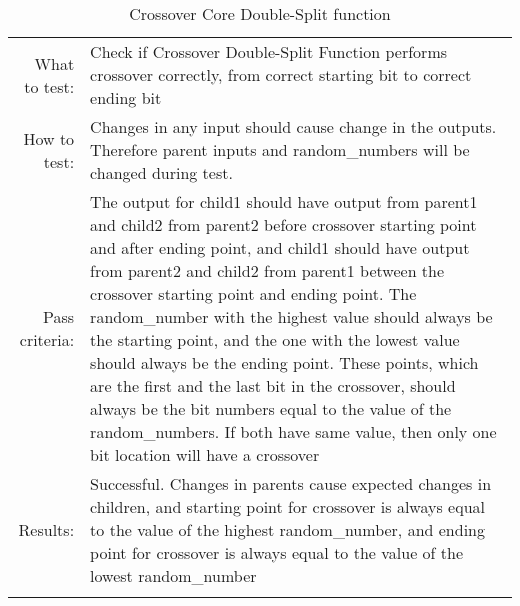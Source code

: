 \begin{table}[H]
  \begin{tabular}{r | p{9cm}}
    \noalign{\smallskip}\hline\noalign{\smallskip}
    
    What to test:  & Check if Crossover Double-Split Function performs crossover
                     correctly, from correct starting bit to correct ending bit \\

    \noalign{\smallskip}\hline\noalign{\smallskip}

    How to test:   &    Changes in any input should cause change in the outputs.
                        Therefore parent inputs and random\_numbers will be changed
                        during test.  
                        \\
                      
    \noalign{\smallskip}\hline\noalign{\smallskip}

    Pass criteria: &    The output for child1 should have output from parent1 and child2
                        from parent2 before crossover starting point and after ending 
                        point, and child1 should have output from parent2 and child2
                        from parent1 between the crossover starting point and ending
                        point. 
                        The random\_number with the highest value should always be the 
                        starting point, and the one with the lowest value should always
                        be the ending point. 
                        These points, which are the first and the last bit in the 
                        crossover, should always be the bit numbers equal to the value     
                        of the random\_numbers. 
                        If both have same value, then only one bit location will have a
                        crossover
                        \\
    \noalign{\smallskip}\hline\noalign{\smallskip}
    
    Results: &      Successful. 
                    Changes in parents cause expected changes in children, and starting 
                    point for crossover is always equal to the value of the highest 
                    random\_number, and ending point for crossover is always equal to 
                    the value of the lowest random\_number
                    \\
   \noalign{\smallskip}\hline\noalign{\smallskip}
  
  
  
  \end{tabular}
  \caption{Crossover Core Double-Split function}
  \label{testing:components:genetic_pipeline:crossover_core_doublesplit}
\end{table}
